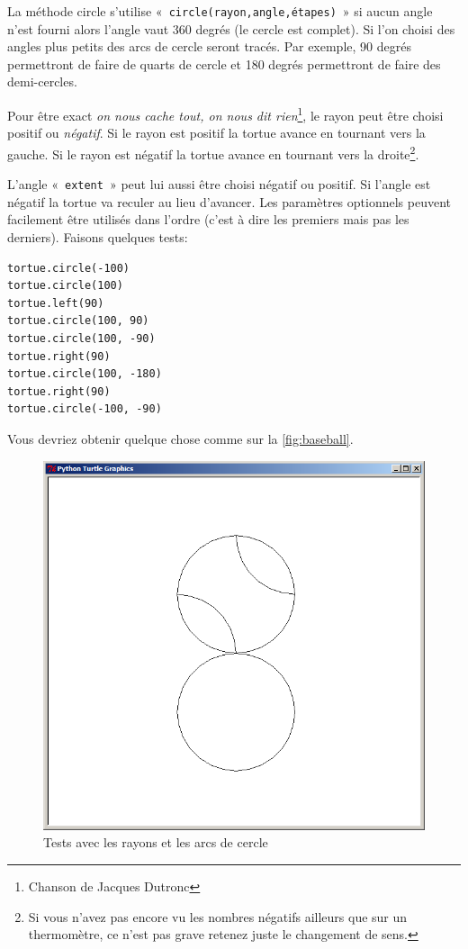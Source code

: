 La méthode circle s'utilise «~\texttt{circle(rayon,angle,étapes)}~» si aucun angle n'est fourni alors l'angle vaut 360 degrés (le cercle est complet). Si l'on choisi des angles plus petits des arcs de cercle seront tracés. Par exemple, 90 degrés permettront de faire de quarts de cercle et 180 degrés permettront de faire des demi-cercles.

Pour être exact \emph{on nous cache tout, on nous dit rien}\footnote{Chanson de Jacques Dutronc}, le rayon peut être choisi positif ou \emph{négatif}. Si le rayon est positif la tortue avance en tournant vers la gauche. Si le rayon est négatif la tortue avance en tournant vers la droite\footnote{Si vous n'avez pas encore vu les nombres négatifs ailleurs que sur un thermomètre, ce n'est pas grave retenez juste le changement de sens.}.

L'angle «~\texttt{extent}~» peut lui aussi être choisi négatif ou positif. Si l'angle est négatif la tortue va reculer au lieu d'avancer. Les paramètres optionnels peuvent facilement être utilisés dans l'ordre (c'est à dire les premiers mais pas les derniers). Faisons quelques tests:

\begin{Verbatim}[frame=single,rulecolor=\color{mbleu}, label=à taper]
tortue.circle(-100)
tortue.circle(100)
tortue.left(90)
tortue.circle(100, 90)
tortue.circle(100, -90)
tortue.right(90)
tortue.circle(100, -180)
tortue.right(90)
tortue.circle(-100, -90)
\end{Verbatim}

Vous devriez obtenir quelque chose comme sur la \autoref{fig:baseball}.

\begin{figure}[h!]
\centering
\includegraphics[scale=0.4]{images/baseball}
\caption{Tests avec les rayons et les arcs de cercle}\label{fig:baseball}
\end{figure}

